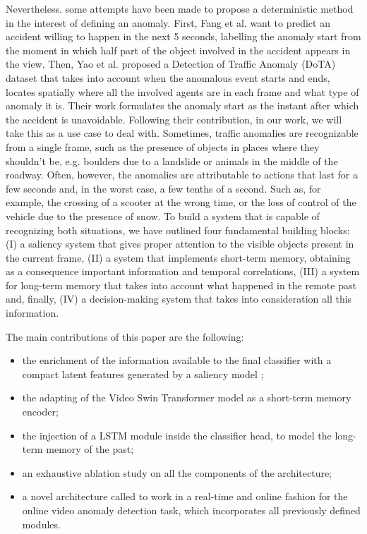 Nevertheless. some attempts have been made to propose a deterministic method in the interest of defining an anomaly.
First, Fang et al. \cite{fang2019dada} want to predict an accident willing to happen in the next 5 seconds, labelling the anomaly start from the moment in which half part of the object involved in the accident appears in the view.
Then, Yao et al. \cite{yao2020when} proposed a Detection of Traffic Anomaly (DoTA) dataset that takes into account when the anomalous event starts and ends, locates spatially where all the involved agents are in each frame and what type of anomaly it is.
Their work formulates the anomaly start as the instant after which the accident is unavoidable.
Following their contribution, in our work, we will take this as a use case to deal with.
Sometimes, traffic anomalies are recognizable from a single frame, such as the presence of objects in places where they shouldn't be, e.g. boulders due to a landslide or animals in the middle of the roadway.
Often, however, the anomalies are attributable to actions that last for a few seconds and, in the worst case, a few tenths of a second.
Such as, for example, the crossing of a scooter at the wrong time, or the loss of control of the vehicle due to the presence of snow.
To build a system that is capable of recognizing both situations, we have outlined four fundamental building blocks: (I) a saliency system that gives proper attention to the visible objects present in the current frame, (II) a system that implements short-term memory, obtaining as a consequence important information and temporal correlations, (III) a system for long-term memory that takes into account what happened in the remote past and, finally, (IV) a decision-making system that takes into consideration all this information.

The main contributions of this paper are the following:
\begin{itemize}
    \item the enrichment of the information available to the final classifier with a compact latent features generated by a saliency model \cite{cornia2016deep};
    \item the adapting of the Video Swin Transformer model \cite{liu_video_2022} as a short-term memory encoder;
    \item the injection of a LSTM module inside the classifier head, to model the long-term memory of the past;
    \item an exhaustive ablation study on all the components of the architecture;
    \item a novel architecture called  to work in a real-time and online fashion for the online video anomaly detection task, which incorporates all previously defined modules.
\end{itemize} 

